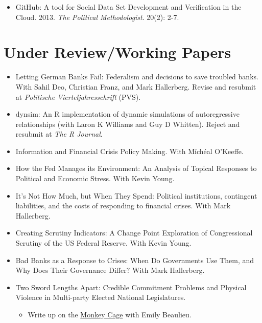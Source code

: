 \documentclass[a4paper]{article}
\begin{document}
{{\begin{itemize}
    \item GitHub: A tool for Social Data Set Development and Verification in the Cloud. 2013. {\emph{The Political Methodologist}}. 20(2): 2-7.

\end{itemize}


\section*{Under Review/Working Papers}

\begin{itemize}

    \item Letting German Banks Fail: Federalism and decisions to save troubled banks. With Sahil Deo, Christian Franz, and Mark Hallerberg. Revise and resubmit at \emph{Politische Vierteljahresschrift} (PVS).

    \item dynsim: An R implementation of dynamic simulations of autoregressive relationships (with Laron K Williams and Guy D Whitten). Reject and resubmit at \emph{The R Journal}.

    \item Information and Financial Crisis Policy Making. With M\'{i}ch\'{e}al O'Keeffe.

    \item How the Fed Manages its Environment: An Analysis of Topical Responses to Political and Economic Stress. With Kevin Young.

    \item It's Not How Much, but When They Spend: Political institutions, contingent liabilities, and the costs of responding to financial crises. With Mark Hallerberg.

    \item Creating Scrutiny Indicators: A Change Point Exploration of Congressional Scrutiny of the US Federal Reserve. With Kevin Young.

    \item Bad Banks as a Response to Crises: When Do Governments Use Them, and Why Does Their Governance Differ? With Mark Hallerberg.

    \item Two Sword Lengths Apart: Credible Commitment Problems and Physical Violence in Multi-party Elected National Legislatures.

        \begin{itemize}
            \item Write up on the \href{http://t.co/fETbFCXcYU}{Monkey Cage} with Emily Beaulieu.
        \end{itemize}


\end{itemize}}}
\end{document}
